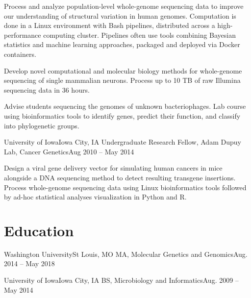 \resumeItemListStart

{Process and analyze population-level whole-genome sequencing data to improve our understanding of structural variation in human genomes. Computation is done in a Linux environment with Bash pipelines, distributed across a high-performance computing cluster. Pipelines often use tools combining Bayesian statistics and machine learning approaches, packaged and deployed via Docker containers.}

{Develop novel computational and molecular biology methods for whole-genome sequencing of single mammalian neurons. Process up to 10 TB of raw Illumina sequencing data in 36 hours.}

{Advise students sequencing the genomes of unknown bacteriophages. Lab course using bioinformatics tools to identify genes, predict their function, and classify into phylogenetic groups.}

\resumeItemListEnd


\resumeSubheading
{University of Iowa}{Iowa City, IA}
{Undergraduate Research Fellow, Adam Dupuy Lab, Cancer Genetics}{Aug 2010 -- May 2014}

\resumeItemListStart

{Design a viral gene delivery vector for simulating human cancers in mice alongside a DNA sequencing method to detect resulting transgene insertions. Process whole-genome sequencing data using Linux bioinformatics tools followed by ad-hoc statistical analyses visualization in Python and R.}

\resumeItemListEnd

\resumeSubHeadingListEnd

\section{Education}
\resumeSubHeadingListStart

\resumeSubheading
{Washington University}{St Louis, MO}
{MA, Molecular Genetics and Genomics}{Aug. 2014 -- May 2018}

\resumeSubheading
{University of Iowa}{Iowa City, IA}
{BS, Microbiology and Informatics}{Aug. 2009 -- May 2014}

\resumeSubHeadingListEnd

